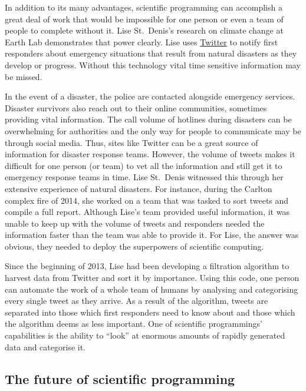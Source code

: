 \documentclass[
]{book}
\begin{document}
In addition to its many advantages, scientific programming can accomplish a great deal of work that would be impossible for one person or even a team of people to complete without it. Lise St.~Denis's research on climate change at Earth Lab demonstrates that power clearly. Lise uses \href{https://twitter.com/lastdenis}{Twitter} to notify first responders about emergency situations that result from natural disasters as they develop or progress. Without this technology vital time sensitive information may be missed.

In the event of a disaster, the police are contacted alongside emergency services. Disaster survivors also reach out to their online communities, sometimes providing vital information. The call volume of hotlines during disasters can be overwhelming for authorities and the only way for people to communicate may be through social media. Thus, sites like Twitter can be a great source of information for disaster response teams. However, the volume of tweets makes it difficult for one person (or team) to vet all the information and still get it to emergency response teams in time. Lise St.~Denis witnessed this through her extensive experience of natural disasters. For instance, during the Carlton complex fire of 2014, she worked on a team that was tasked to sort tweets and compile a full report. Although Lise's team provided useful information, it was unable to keep up with the volume of tweets and responders needed the information faster than the team was able to provide it. For Lise, the answer was obvious, they needed to deploy the superpowers of scientific computing.

Since the beginning of 2013, Lise had been developing a filtration algorithm to harvest data from Twitter and sort it by importance. Using this code, one person can automate the work of a whole team of humans by analysing and categorising every single tweet as they arrive. As a result of the algorithm, tweets are separated into those which first responders need to know about and those which the algorithm deems as less important. One of scientific programmings' capabilities is the ability to ``look'' at enormous amounts of rapidly generated data and categorise it.

\hypertarget{the-future-of-scientific-programming}{%
\subsection*{The future of scientific programming}\label{the-future-of-scientific-programming}}
\end{document}
